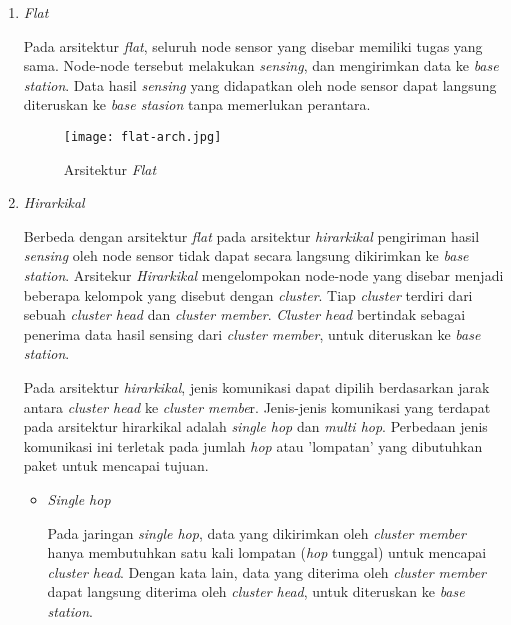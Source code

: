 \begin{enumerate}
    \item \textit{Flat}
    
    Pada arsitektur \textit{flat}, seluruh node sensor yang disebar memiliki tugas yang sama. Node-node tersebut melakukan \textit{sensing}, dan mengirimkan data ke \textit{base station}. Data hasil \textit{sensing} yang didapatkan oleh node sensor dapat langsung diteruskan ke \textit{base stasion} tanpa memerlukan perantara.
    
    \begin{figure}[H]
    	\centering  
    	\texttt{[image: flat-arch.jpg]}  
    	\caption[\textit{Arsitektur \textit{Flat}}]{Arsitektur \textit{Flat}}
    	\label{fig:Aristektur Flat} 
    \end{figure}
    
    \item \textit{Hirarkikal}

    Berbeda dengan arsitektur \textit{flat} pada arsitektur \textit{hirarkikal} pengiriman hasil \textit{sensing} oleh node sensor tidak dapat secara langsung dikirimkan ke \textit{base station}. Arsitekur \textit{Hirarkikal} mengelompokan node-node yang disebar menjadi beberapa kelompok yang disebut dengan \textit{cluster}. Tiap \textit{cluster} terdiri dari sebuah \textit{ cluster head} dan \textit{cluster member}.\textit{ Cluster head} bertindak sebagai penerima data hasil sensing dari \textit{cluster member}, untuk diteruskan ke \textit{base station}.
    
    Pada arsitektur \textit{hirarkikal}, jenis komunikasi dapat dipilih berdasarkan jarak antara \textit{cluster head} ke \textit{cluster membe}r. Jenis-jenis komunikasi yang terdapat pada arsitektur hirarkikal adalah \textit{single hop} dan \textit{multi hop}. Perbedaan jenis komunikasi ini terletak pada jumlah \textit{hop} atau 'lompatan' yang dibutuhkan paket untuk mencapai tujuan.
    
    \begin{itemize}
        \item \textit{Single hop}
        
        Pada jaringan \textit{single hop}, data yang dikirimkan oleh \textit{cluster member} hanya membutuhkan satu kali lompatan (\textit{hop} tunggal) untuk mencapai \textit{cluster head}. Dengan kata lain, data yang diterima oleh \textit{cluster member} dapat langsung diterima oleh \textit{cluster head}, untuk diteruskan ke \textit{base station}.
        

\end{itemize}
\end{enumerate}

